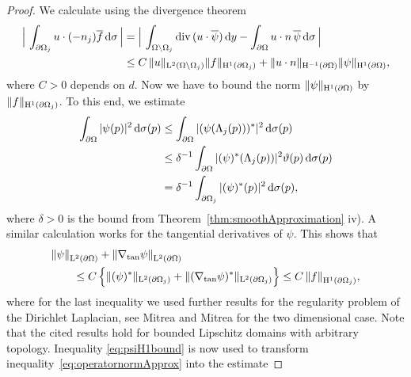 \begin{proof}
  We calculate using the divergence theorem
  \begin{align}
    \Big| \, \int_{\partial\Omega_j} u \cdot (-n_j) \overline f \, {\operatorname{d}\!{\sigma}} \, \Big|
    &= \Big| \, \int_{\Omega \setminus \Omega_j} \mathrm{div\,} (u \cdot \overline\psi) \, {\operatorname{d}\!{y}} - \int_{\partial\Omega} u\cdot n \, \overline \psi \, {\operatorname{d}\!{\sigma}} \, \Big|\nonumber\\
    &\leq C\, \|u\|_{\mathrm{L}^2(\Omega \setminus \Omega_j)} \|f\|_{\mathrm{H}^1(\partial\Omega_j)} + \|u \cdot n\|_{\mathrm{H}^{-1}(\partial\Omega)} \|\psi\|_{\mathrm{H}^1(\partial\Omega)}, \label{eq:operatornormApprox}
  \end{align}
  where $C > 0$ depends on $d$.
  Now we have to bound the norm $\|\psi\|_{\mathrm{H}^1(\partial\Omega)}$ by $\|f\|_{\mathrm{H}^1(\partial\Omega_j)}$.
  To this end, we estimate
  \begin{align*}
    \int_{\partial\Omega} |\psi(p)|^2 \, {\operatorname{d}\!{\sigma}}(p)
    &\leq \int_{\partial\Omega} |(\psi(\Lambda_j(p)))^*|^2 \, {\operatorname{d}\!{\sigma}}(p) \\
    &\leq \delta^{-1} \int_{\partial\Omega} | (\psi)^*(\Lambda_j(p))|^2 \vartheta(p) \, {\operatorname{d}\!{\sigma}}(p) \\
    &= \delta^{-1} \int_{\partial\Omega_j} |(\psi)^*(p)|^2 \, {\operatorname{d}\!{\sigma}}(p) ,
  \end{align*}
  where $\delta > 0$ is the bound from Theorem~\ref{thm:smoothApproximation} iv).
  A similar calculation works for the tangential derivatives of $\psi$.
  This shows that
  \begin{align}
    \label{eq:psiH1bound}
    \begin{alignedat}{1}
    &\|\psi\|_{\mathrm{L}^2(\partial\Omega)}^{} + \|\nabla_{\mathrm{tan}} \psi\|_{\mathrm{L}^2(\partial\Omega)}^{} \\
    &\qquad \leq C \, \Big\{ \|(\psi)^*\|_{\mathrm{L}^2(\partial\Omega_j)} + \| (\nabla_{\mathrm{tan}}\psi)^* \|_{\mathrm{L}^2(\partial\Omega_j)} \Big\} 
    \leq C \, \|f\|_{\mathrm{H}^1(\partial\Omega_j)}^{},
  \end{alignedat}
  \end{align}
  where for the last inequality we used further results for the regularity problem of the Dirichlet Laplacian, see Mitrea \cite[Thm.\@~5.1]{mitrea3d} and Mitrea \cite[p.\@~91]{mitrea2d} for the two dimensional case.
  Note that the cited results hold for bounded Lipschitz domains with arbitrary topology.
  Inequality \eqref{eq:psiH1bound} is now used to transform inequality~\eqref{eq:operatornormApprox} into the estimate

\end{proof}
